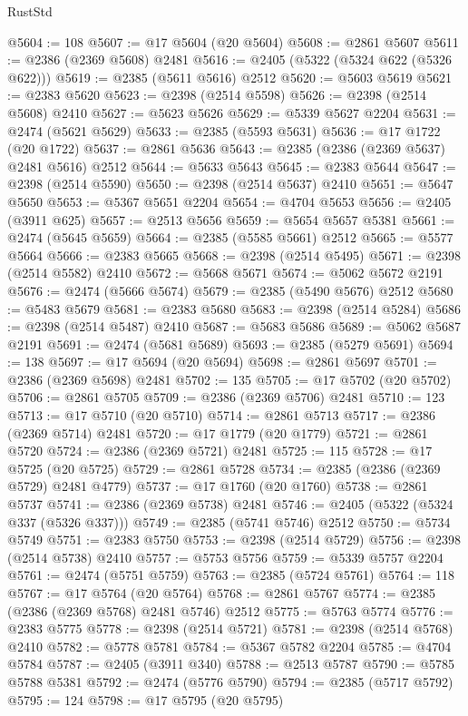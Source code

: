 \begin{lexlean}{RustStd}
\begin{coremodule}
@5604 := 108
@5607 := @17 @5604 (@20 @5604)
@5608 := @2861 @5607
@5611 := @2386 (@2369 @5608) @2481
@5616 := @2405 (@5322 (@5324 @622 (@5326 @622)))
@5619 := @2385 (@5611 @5616) @2512
@5620 := @5603 @5619
@5621 := @2383 @5620
@5623 := @2398 (@2514 @5598)
@5626 := @2398 (@2514 @5608) @2410
@5627 := @5623 @5626
@5629 := @5339 @5627 @2204
@5631 := @2474 (@5621 @5629)
@5633 := @2385 (@5593 @5631)
@5636 := @17 @1722 (@20 @1722)
@5637 := @2861 @5636
@5643 := @2385 (@2386 (@2369 @5637) @2481 @5616) @2512
@5644 := @5633 @5643
@5645 := @2383 @5644
@5647 := @2398 (@2514 @5590)
@5650 := @2398 (@2514 @5637) @2410
@5651 := @5647 @5650
@5653 := @5367 @5651 @2204
@5654 := @4704 @5653
@5656 := @2405 (@3911 @625)
@5657 := @2513 @5656
@5659 := @5654 @5657 @5381
@5661 := @2474 (@5645 @5659)
@5664 := @2385 (@5585 @5661) @2512
@5665 := @5577 @5664
@5666 := @2383 @5665
@5668 := @2398 (@2514 @5495)
@5671 := @2398 (@2514 @5582) @2410
@5672 := @5668 @5671
@5674 := @5062 @5672 @2191
@5676 := @2474 (@5666 @5674)
@5679 := @2385 (@5490 @5676) @2512
@5680 := @5483 @5679
@5681 := @2383 @5680
@5683 := @2398 (@2514 @5284)
@5686 := @2398 (@2514 @5487) @2410
@5687 := @5683 @5686
@5689 := @5062 @5687 @2191
@5691 := @2474 (@5681 @5689)
@5693 := @2385 (@5279 @5691)
@5694 := 138
@5697 := @17 @5694 (@20 @5694)
@5698 := @2861 @5697
@5701 := @2386 (@2369 @5698) @2481
@5702 := 135
@5705 := @17 @5702 (@20 @5702)
@5706 := @2861 @5705
@5709 := @2386 (@2369 @5706) @2481
@5710 := 123
@5713 := @17 @5710 (@20 @5710)
@5714 := @2861 @5713
@5717 := @2386 (@2369 @5714) @2481
@5720 := @17 @1779 (@20 @1779)
@5721 := @2861 @5720
@5724 := @2386 (@2369 @5721) @2481
@5725 := 115
@5728 := @17 @5725 (@20 @5725)
@5729 := @2861 @5728
@5734 := @2385 (@2386 (@2369 @5729) @2481 @4779)
@5737 := @17 @1760 (@20 @1760)
@5738 := @2861 @5737
@5741 := @2386 (@2369 @5738) @2481
@5746 := @2405 (@5322 (@5324 @337 (@5326 @337)))
@5749 := @2385 (@5741 @5746) @2512
@5750 := @5734 @5749
@5751 := @2383 @5750
@5753 := @2398 (@2514 @5729)
@5756 := @2398 (@2514 @5738) @2410
@5757 := @5753 @5756
@5759 := @5339 @5757 @2204
@5761 := @2474 (@5751 @5759)
@5763 := @2385 (@5724 @5761)
@5764 := 118
@5767 := @17 @5764 (@20 @5764)
@5768 := @2861 @5767
@5774 := @2385 (@2386 (@2369 @5768) @2481 @5746) @2512
@5775 := @5763 @5774
@5776 := @2383 @5775
@5778 := @2398 (@2514 @5721)
@5781 := @2398 (@2514 @5768) @2410
@5782 := @5778 @5781
@5784 := @5367 @5782 @2204
@5785 := @4704 @5784
@5787 := @2405 (@3911 @340)
@5788 := @2513 @5787
@5790 := @5785 @5788 @5381
@5792 := @2474 (@5776 @5790)
@5794 := @2385 (@5717 @5792)
@5795 := 124
@5798 := @17 @5795 (@20 @5795)

\end{coremodule}
\end{lexlean}
